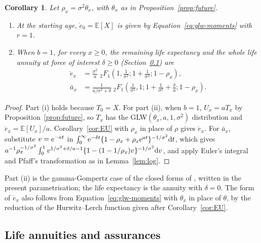 \documentclass[12pt]{article}
\newcommand{\E}{\mathbb{E}}       %
\newcommand{\e}{{\rm e}}         %
\newcommand{\dd}{{\rm d}}        %
\newtheorem{corollary}{Corollary}
\begin{document}
\begin{corollary}\label{cor:ex}
Let $\rho_x=\sigma^2\theta_x$, with $\theta_x$ as in Proposition~\ref{prop:future}.
\begin{enumerate}\renewcommand{\labelenumi}{(\roman{enumi})}
\item At the starting age, $\mathring{e}_0=\E[X]$ is given by Equation~\eqref{eq:glw-moments} with $r=1$.
\item When $b=1$, for every $x\geq0$, the remaining life expectancy and the whole life annuity at force of interest $\delta\geq0$ (Section~\ref{sec:annuities}) are
\begin{align*}
\mathring{e}_x&=\frac{\sigma^2}{a}\;{}_2F_1\!\left(1,\frac1{\sigma^2};1+\frac1{\sigma^2};1-\rho_x\right),\\
\bar{a}_x&=\frac{1}{a/\sigma^2+\delta}\;{}_2F_1\!\left(\frac1{\sigma^2},1;1+\frac1{\sigma^2}+\frac\delta a;1-\rho_x\right).
\end{align*}
\end{enumerate}
\end{corollary}

\begin{proof}
Part (i) holds because $T_0=X$. For part (ii), when $b=1$, $U_x=aT_x$ by Proposition~\ref{prop:future}, so $T_x$ has the GLW$(\theta_x,a,1,\sigma^2)$ distribution and $\mathring{e}_x=\E[U_x]/a$. Corollary~\ref{cor:EU} with $\rho_x$ in place of $\rho$ gives $\mathring{e}_x$. For $\bar{a}_x$, substitute $v=\e^{-at}$ in $\int_0^\infty\e^{-\delta t}\{1-\rho_x+\rho_x\e^{at}\}^{-1/\sigma^2}\dd t$, which gives $a^{-1}\rho_x^{-1/\sigma^2}\int_0^1v^{1/\sigma^2+\delta/a-1}\{1-(1-1/\rho_x)v\}^{-1/\sigma^2}\dd v$, and apply Euler's integral and Pfaff's transformation as in Lemma~\ref{lem:log}.
\end{proof}

Part (ii) is the gamma-Gompertz case of the closed forms of \citet[Proposition~5 and Corollary~5]{castellares2024gamma}, written in the present parametrisation; the life expectancy is the annuity with $\delta=0$. The form of $\mathring{e}_x$ also follows from Equation~\eqref{eq:glw-moments} with $\theta_x$ in place of $\theta$, by the reduction of the Hurwitz--Lerch function given after Corollary~\ref{cor:EU}.

\subsection{Life annuities and assurances}\label{sec:annuities}
\end{document}

